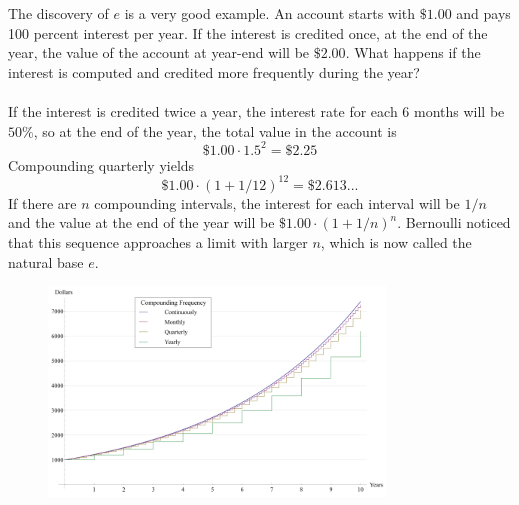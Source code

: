 \documentclass[a4paper]{article}
\begin{document}
	The discovery of $\mathit{e}$ is a very good example. An account starts with $\$1.00$ and pays 100 percent interest per year. If the interest is credited once, at the end of the year, the value of the account at year-end will be $\$2.00$. What happens if the interest is computed and credited more frequently during the year?\\\\
	If the interest is credited twice a year, the interest rate for each 6 months will be $50\%$, so at the end of the year, the total value in the account is
	\begin{equation*}
	\$1.00 \cdot 1.5^2 = \$2.25
	\end{equation*}
	Compounding quarterly yields
	\begin{equation*}
	\$1.00 \cdot (1 + 1/12)^{12} = \$2.613...
	\end{equation*}
	If there are $n$ compounding intervals, the interest for each interval will be $1/n$ and the value at the end of the year will be $\$1.00\cdot(1+1/n)^n$. Bernoulli noticed that this sequence approaches a limit with larger $n$, which is now called the natural base $\mathit{e}$.
	\begin{figure}[H]
		\centering
		\includegraphics[width=0.8\textwidth]{euler1.png}
	\end{figure}
	
	\newpage
	
	
\end{document}

